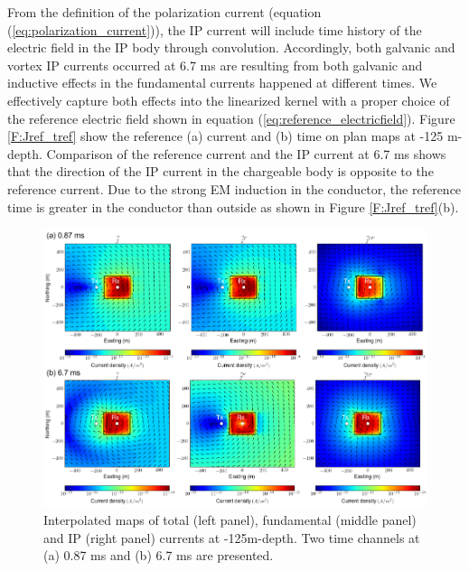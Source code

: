 \documentclass[a4paper, 11pt]{article}
\begin{document}
From the definition of the polarization current (equation (\ref{eq:polarization_current})), the IP current will include time history of the electric field in the IP body through convolution. 
Accordingly, both galvanic and vortex IP currents occurred at 6.7 ms are resulting from both galvanic and inductive effects in the fundamental currents happened at different times. 
We effectively capture both effects into the linearized kernel with a proper choice of the reference electric field shown in equation (\ref{eq:reference_electricfield}). 
Figure \ref{F:Jref_tref} show the reference (a) current and (b) time on plan maps at -125 m-depth. 
Comparison of the reference current and the IP current at 6.7 ms shows that the direction of the IP current in the chargeable body is opposite to the reference current. 
Due to the strong EM induction in the conductor, the reference time is greater in the conductor than outside as shown in Figure \ref{F:Jref_tref}(b). 

\begin{figure}[htb]
  \centering
  \includegraphics[width=1\textwidth]{figures/IPcurrent_Plan.png}
  \caption{Interpolated maps of total (left panel), fundamental (middle panel) and IP (right panel) currents at -125m-depth. Two time channels at (a) 0.87 ms and (b) 6.7 ms are presented.}
  \label{F:IPcurrent_Plan}
\end{figure}
\end{document}
